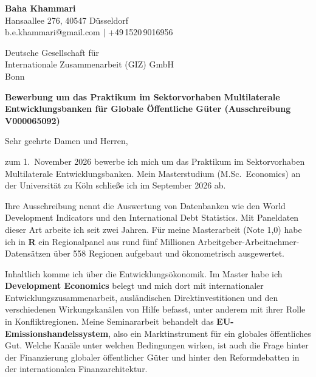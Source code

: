 \documentclass[a4paper,11pt]{article}
\begin{document}
\noindent
{\large\bfseries Baha Khammari}\\[2pt]
{\small
Hansaallee 276, 40547 D\"usseldorf\\
b.e.khammari@gmail.com \quad $\vert$ \quad +49\,1520\,9016956
}

\vspace{10mm}

\noindent
{\small
Deutsche Gesellschaft f\"ur\\
Internationale Zusammenarbeit (GIZ) GmbH\\
Bonn
}

\vspace{6mm}


\vspace{5mm}

\noindent\textbf{Bewerbung um das Praktikum im Sektorvorhaben Multilaterale Entwicklungsbanken f\"ur Globale \"Offentliche G\"uter (Ausschreibung V000065092)}

\vspace{3mm}

\noindent Sehr geehrte Damen und Herren,

zum 1.\ November 2026 bewerbe ich mich um das Praktikum im Sektorvorhaben Multilaterale Entwicklungsbanken. Mein Masterstudium (M.Sc.\ Economics) an der Universit\"at zu K\"oln schlie\ss{}e ich im September 2026 ab.

Ihre Ausschreibung nennt die Auswertung von Datenbanken wie den World Development Indicators und den International Debt Statistics. Mit Paneldaten dieser Art arbeite ich seit zwei Jahren. F\"ur meine Masterarbeit (Note 1,0) habe ich in \textbf{R} ein Regionalpanel aus rund f\"unf Millionen Arbeitgeber-Arbeitnehmer-Datens\"atzen \"uber 558 Regionen aufgebaut und \"okonometrisch ausgewertet.

Inhaltlich komme ich \"uber die Entwicklungs\"okonomik. Im Master habe ich \textbf{Development Economics} belegt und mich dort mit internationaler Entwicklungszusammenarbeit, ausl\"andischen Direktinvestitionen und den verschiedenen Wirkungskan\"alen von Hilfe befasst, unter anderem mit ihrer Rolle in Konfliktregionen. Meine Seminararbeit behandelt das \textbf{EU-Emissionshandelssystem}, also ein Marktinstrument f\"ur ein globales \"offentliches Gut. Welche Kan\"ale unter welchen Bedingungen wirken, ist auch die Frage hinter der Finanzierung globaler \"offentlicher G\"uter und hinter den Reformdebatten in der internationalen Finanzarchitektur.
\end{document}
